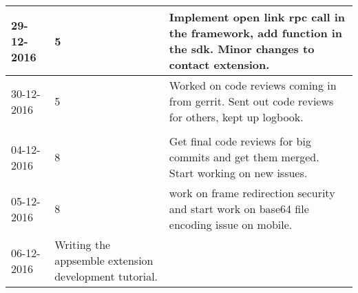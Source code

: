 \begin{tabular}{|p{2cm}|p{1cm}|p{10cm}|}
	\hline
	29-12-2016 & 5 & Implement open link rpc call in the framework, add function in the sdk. Minor changes to contact extension. \\ \hline
	30-12-2016 & 5 & Worked on code reviews coming in from gerrit. Sent out code reviews for others, kept up logbook. \\ \hline
	
	\\ \hline
	
	04-12-2016 & 8 & Get final code reviews for big commits and get them merged. Start working on new issues. \\ \hline
	05-12-2016 & 8 & work on frame redirection security and start work on base64 file encoding issue on mobile. \\ \hline
	06-12-2016 & Writing the appsemble extension development tutorial. \\ \hline
\end{tabular}
